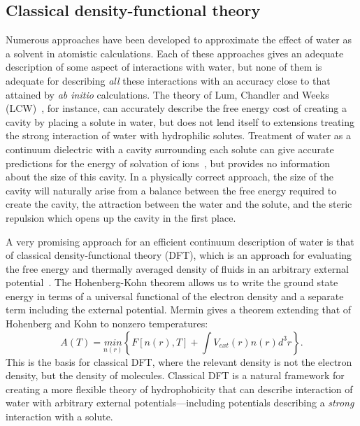 \documentclass[letterpaper,twocolumn,amsmath,amssymb,prb]{revtex4-1}
\begin{document}
\subsection{Classical density-functional theory}

Numerous approaches have been developed to approximate the effect of water
as a solvent in atomistic calculations.  Each of these approaches gives an
adequate description of some aspect of interactions with water, but none of
them is adequate for describing \emph{all} these interactions with an
accuracy close to that attained by \emph{ab initio} calculations.  The
theory of Lum, Chandler and Weeks (LCW)~\cite{lum1999hydrophobicity}, for 
instance, can
accurately describe the free energy cost of creating a cavity by placing a
solute in water, but does not lend itself to extensions treating the strong
interaction of water with hydrophilic solutes.  Treatment of water as a
continuum dielectric with a cavity surrounding each solute can give
accurate predictions for the energy of solvation of ions~\cite{latimer1939,
rashin1985, zhan1998, hsu1999, hildebrandt2004, hildebrandt2007}, but
provides no information about the size of this cavity.  In a physically
correct approach, the size of the cavity will naturally arise from a
balance between the free energy required to create the cavity, the
attraction between the water and the solute, and the steric repulsion which
opens up the cavity in the first place.

A very promising approach for an efficient continuum description of water
is that of classical density-functional theory (DFT), which is an approach
for evaluating the free energy and thermally averaged density of fluids in
an arbitrary external potential~\cite{ebner1976density}. The Hohenberg-Kohn
theorem\cite{hohenberg1964inhomogeneous} allows us to write the ground state
energy in terms of a universal functional of the electron density and a separate
term including the external potential. Mermin\cite{mermin1965thermal} gives a
theorem extending that of Hohenberg and Kohn to nonzero temperatures:
\begin{equation}
  A(T) = \underset{n(r)}{min}\left\{ F[n(r),T] + \int V_{ext}(r) n(r)
d^3r\right\}.
\end{equation}
This is the basis for classical DFT, where the relevant density is not the
electron density, but the density of molecules. Classical DFT is a
natural framework for creating a more flexible theory of hydrophobicity
that can describe interaction of water with arbitrary external
potentials---including potentials describing a \emph{strong} interaction
with a solute.
 
\end{document}
